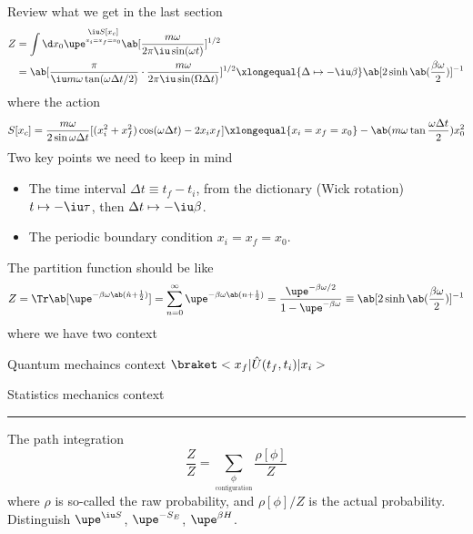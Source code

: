 Review what we get in the last section
\begin{equation}
  \begin{aligned}
    Z & = \int \d x_0 \upe^{\underset{x_i = x_f = x_0}{\iu S[x_c]}} \ab[\frac{m\omega}{2\pi\iu\sin(\omega t)}]^{1/2}\\
  & = \ab[\frac\pi{\iu m\omega \tan(\omega\Delta t/2)} \cdot
      \frac{m\omega}{2\pi\iu\sin(\Omega\Delta t)}]^{1/2}
    \xlongequal{\Delta \mapsto -\iu\beta}
      \ab[2\sinh\ab(\frac{\beta\omega}{2})]^{-1}
  \end{aligned}
\end{equation}
where the action
\begin{equation}
  S[x_c] = \frac{m\omega}{2\sin\omega\Delta t}
            [(x_i^2 + x_f^2) \cos(\omega\Delta t) - 2x_ix_f]
  \xlongequal{x_i=x_f=x_0} -\ab(m\omega \tan\frac{\omega\Delta t}{2}) x_0^2
\end{equation}
Two key points we need to keep in mind
\begin{itemize}
  \item The time interval $\Delta t \equiv t_f - t_i$,
  from the dictionary (Wick rotation) $t \mapsto -\iu\tau$,
  then $\Delta t \mapsto -\iu\beta$.
  \item The periodic boundary condition $x_i = x_f = x_0$.
\end{itemize}
The partition function should be like
\begin{equation}
  Z = \Tr\ab[\upe^{-\beta\omega\ab(\hat n+\frac12)}]
= \sum_{n=0}^\infty \upe^{-\beta\omega\ab(n+\frac12)}
= \frac{\upe^{-\beta\omega/2}}{1 - \upe^{-\beta\omega}}
  \equiv \ab[2\sinh\ab(\frac{\beta\omega}{2})]^{-1}
\end{equation}
where we have two context
\begin{enumext}
  \item Quantum mechaincs context $\braket<x_f|\hat U(t_f, t_i)|x_i>$
  \item Statistics mechanics context
\end{enumext}
\hrule
The path integration
\[
  \frac ZZ = \sum_{\underset{\text{configuration}}{\phi}} \frac{\rho[\phi]}{Z}
\]
where $\rho$ is so-called the raw probability, and $\rho[\phi]/Z$ is the actual probability.
Distinguish $\upe^{\iu S}$, $\upe^{-S_E}$, $\upe^{\beta H}$.
\begin{center}
\end{center}
